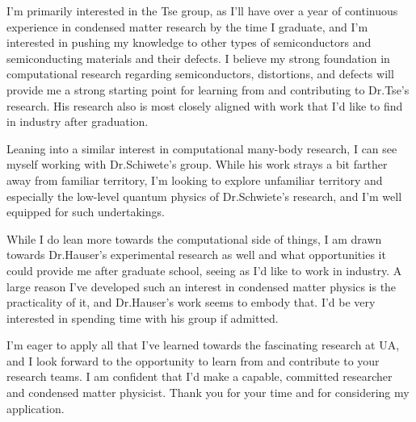 \documentclass[11pt]{article}
\newcommand{\schoolabbr}{UA}
\begin{document}
I'm primarily interested in the Tse group, as I'll have over a year of continuous experience in condensed matter research by the time I graduate, and I'm interested in pushing my knowledge to other types of semiconductors and semiconducting materials and their defects. I believe my strong foundation in computational research regarding semiconductors, distortions, and defects will provide me a strong starting point for learning from and contributing to Dr.\@ Tse's research. His research also is most closely aligned with work that I'd like to find in industry after graduation.

Leaning into a similar interest in computational many-body research, I can see myself working with Dr.\@ Schiwete's group. While his work strays a bit farther away from familiar territory, I'm looking to explore unfamiliar territory and especially the low-level quantum physics of Dr.\@ Schwiete's research, and I'm well equipped for such undertakings.

While I do lean more towards the computational side of things, I am drawn towards Dr.\@ Hauser's experimental research as well and what opportunities it could provide me after graduate school, seeing as I'd like to work in industry. A large reason I've developed such an interest in condensed matter physics is the practicality of it, and Dr.\@ Hauser's work seems to embody that. I'd be very interested in spending time with his group if admitted.

I'm eager to apply all that I've learned towards the fascinating research at \schoolabbr{}, and I look forward to the opportunity to learn from and contribute to your research teams. I am confident that I'd make a capable, committed researcher and condensed matter physicist. Thank you for your time and for considering my application.
\end{document}
